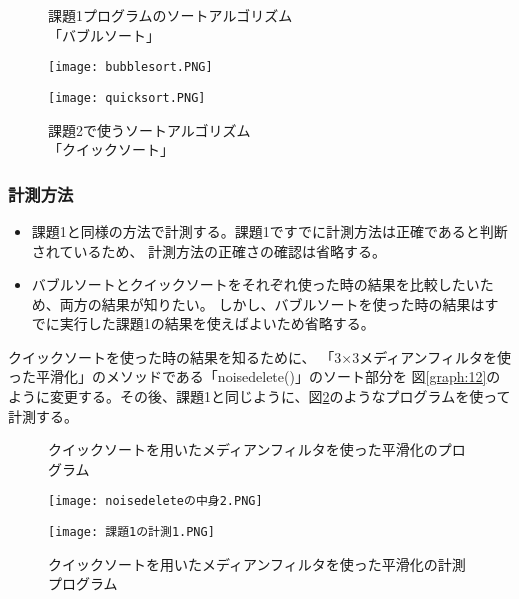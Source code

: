 \begin{itemize}
\begin{itemize}
  \end{itemize}

  \begin{figure}[htbp]
    \begin{minipage}[t]{0.45\hsize}
      \centering
      \caption{課題1プログラムのソートアルゴリズム\\「バブルソート」}
      \label{graph:10}
      \texttt{[image: bubblesort.PNG]}
    \end{minipage}
    \begin{minipage}[t]{0.5\hsize}
      \centering
      \caption{課題2で使うソートアルゴリズム\\「クイックソート」\cite{url2}}
      \label{graph:11}
      \texttt{[image: quicksort.PNG]}
    \end{minipage}
  \end{figure}

\end{itemize}
\clearpage

\subsubsection{計測方法}
\begin{itemize}
  \item 課題1と同様の方法で計測する。課題1ですでに計測方法は正確であると判断されているため、
  計測方法の正確さの確認は省略する。
  \item バブルソートとクイックソートをそれぞれ使った時の結果を比較したいため、両方の結果が知りたい。
  しかし、バブルソートを使った時の結果はすでに実行した課題1の結果を使えばよいため省略する。
\end{itemize}
クイックソートを使った時の結果を知るために、
  「3×3メディアンフィルタを使った平滑化」のメソッドである「noisedelete()」のソート部分を
  図\ref{graph:12}のように変更する。その後、課題1と同じように、図\ref{graph:13}のようなプログラムを使って計測する。
  \begin{figure}[htbp]
    \begin{minipage}[t]{0.45\hsize}
      \centering
      \caption{クイックソートを用いたメディアンフィルタを使った平滑化のプログラム}
      \label{graph:12}
      \texttt{[image: noisedeleteの中身2.PNG]}
    \end{minipage}
    \begin{minipage}[t]{0.45\hsize}
      \centering
      \caption{クイックソートを用いたメディアンフィルタを使った平滑化の計測プログラム}
      \label{graph:13}
      \texttt{[image: 課題1の計測1.PNG]}
    \end{minipage}
  \end{figure}

